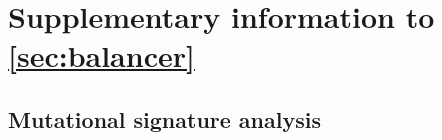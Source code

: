 \chapter{Supplementary information to \cref{sec:balancer}}
\label{sec:suppl_balancer}

\section{Mutational signature analysis}
\label{sec:mutsign}

